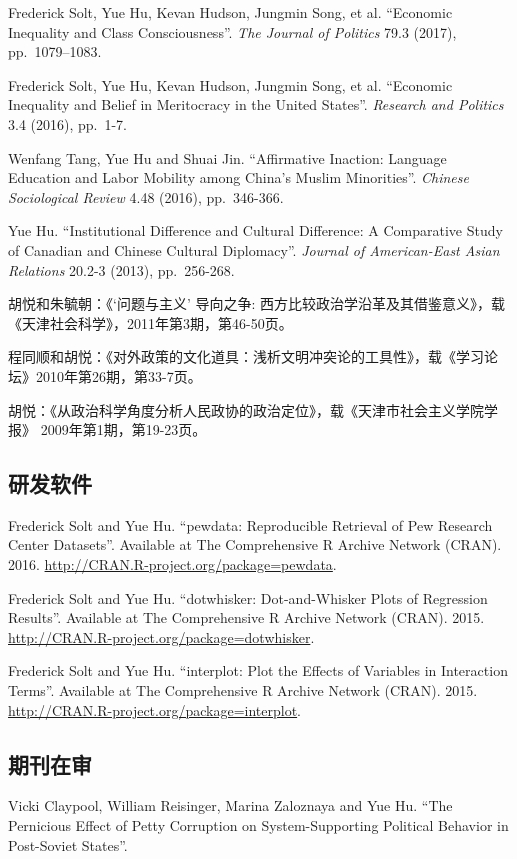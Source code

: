 \documentclass[10.5pt,]{article}
\begin{document}
Frederick Solt, Yue Hu, Kevan Hudson, Jungmin Song, et al. ``Economic
Inequality and Class Consciousness''. \emph{The Journal of Politics}
79.3 (2017), pp.~1079--1083.

Frederick Solt, Yue Hu, Kevan Hudson, Jungmin Song, et al. ``Economic
Inequality and Belief in Meritocracy in the United States''.
\emph{Research and Politics} 3.4 (2016), pp.~1-7.

Wenfang Tang, Yue Hu and Shuai Jin. ``Affirmative Inaction: Language
Education and Labor Mobility among China's Muslim Minorities''.
\emph{Chinese Sociological Review} 4.48 (2016), pp.~346-366.

Yue Hu. ``Institutional Difference and Cultural Difference: A
Comparative Study of Canadian and Chinese Cultural Diplomacy''.
\emph{Journal of American-East Asian Relations} 20.2-3 (2013),
pp.~256-268.

胡悦和朱毓朝：《`问题与主义' 导向之争:
西方比较政治学沿革及其借鉴意义》，载《天津社会科学》，2011年第3期，第46-50页。

程同顺和胡悦：《对外政策的文化道具：浅析文明冲突论的工具性》，载《学习论坛》2010年第26期，第33-7页。

胡悦：《从政治科学角度分析人民政协的政治定位》，载《天津市社会主义学院学报》
2009年第1期，第19-23页。

\subsection{研发软件}

Frederick Solt and Yue Hu. ``pewdata: Reproducible Retrieval of Pew
Research Center Datasets''. Available at The Comprehensive R Archive
Network (CRAN). 2016. \url{http://CRAN.R-project.org/package=pewdata}.

Frederick Solt and Yue Hu. ``dotwhisker: Dot-and-Whisker Plots of
Regression Results''. Available at The Comprehensive R Archive Network
(CRAN). 2015. \url{http://CRAN.R-project.org/package=dotwhisker}.

Frederick Solt and Yue Hu. ``interplot: Plot the Effects of Variables in
Interaction Terms''. Available at The Comprehensive R Archive Network
(CRAN). 2015. \url{http://CRAN.R-project.org/package=interplot}.

\subsection{期刊在审}

Vicki Claypool, William Reisinger, Marina Zaloznaya and Yue Hu. ``The
Pernicious Effect of Petty Corruption on System-Supporting Political
Behavior in Post-Soviet States''.
\end{document}
